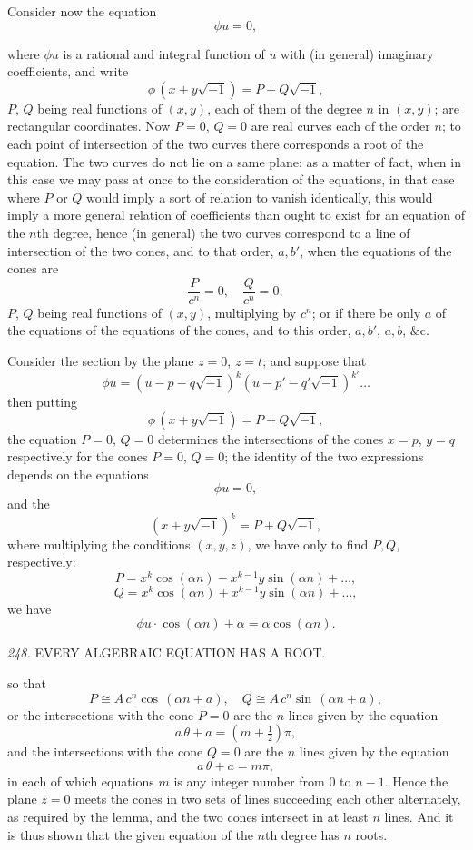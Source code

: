 \documentclass[11pt,a4paper]{article}
\begin{document}
Consider now the equation
\[
\phi u = 0,
\]

\setcounter{page}{118}

where $\phi u$ is a rational and integral function of $u$ with (in general) imaginary coefficients, and write
\[
\phi\,(x+y\sqrt{-1}) = P + Q\sqrt{-1},
\]
$P$, $Q$ being real functions of $(x, y)$, each of them of the degree $n$ in $(x, y)$; are rectangular coordinates. Now $P=0$, $Q=0$ are real curves each of the order $n$; to each point of intersection of the two curves there corresponds a root of the equation. The two curves do not lie on a same plane: as a matter of fact, when in this case we may pass at once to the consideration of the equations, in that case where $P$ or $Q$ would imply a sort of relation to vanish identically, this would imply a more general relation of coefficients than ought to exist for an equation of the $n$th degree, hence (in general) the two curves correspond to a line of intersection of the two cones, and to that order, $a, b'$, when the equations of the cones are
\[
\frac{P}{c^n}=0,\quad \frac{Q}{c^n}=0,
\]
$P$, $Q$ being real functions of $(x, y)$, multiplying by $c^n$; or if there be only $a$ of the equations of the equations of the cones, and to this order, $a, b'$, $a, b$, $\&$c.

Consider the section by the plane $z=0$, $z=t$; and suppose that
\[
\phi u = (u - p - q\sqrt{-1})^k (u - p' - q'\sqrt{-1})^{k'} \ldots
\]
then putting
\[
\phi\,(x+y\sqrt{-1}) = P + Q\sqrt{-1},
\]
the equation $P=0$, $Q=0$ determines the intersections of the cones $x=p$, $y=q$ respectively for the cones $P=0$, $Q=0$; the identity of the two expressions depends on the equations
\[
\phi u = 0,
\]
and the
\[
(x+y\sqrt{-1})^k = P + Q\sqrt{-1},
\]
where multiplying the conditions $(x, y, z)$, we have only to find $P, Q$, respectively:
\[
P = x^k\cos(\alpha n) - x^{k-1}y\sin(\alpha n) + \ldots,
\]
\[
Q = x^k\cos(\alpha n) + x^{k-1}y\sin(\alpha n) + \ldots,
\]
we have
\[
\phi u \cdot \cos(\alpha n) + \alpha = \alpha \cos(\alpha n).
\]

\setcounter{page}{119}

\noindent\textit{248.} \quad EVERY ALGEBRAIC EQUATION HAS A ROOT.

so that
\[
P\cong A\,c^n\cos\,(\alpha n + a),\quad Q\cong A\,c^n\sin\,(\alpha n + a),
\]
or the intersections with the cone $P=0$ are the $n$ lines given by the equation
\[
a\,\theta + a = (m + \tfrac{1}{2})\pi,
\]
and the intersections with the cone $Q=0$ are the $n$ lines given by the equation
\[
a\,\theta + a = m\pi,
\]
in each of which equations $m$ is any integer number from 0 to $n-1$. Hence the plane $z = 0$ meets the cones in two sets of lines succeeding each other alternately, as required by the lemma, and the two cones intersect in at least $n$ lines. And it is thus shown that the given equation of the $n$th degree has $n$ roots.
\end{document}
